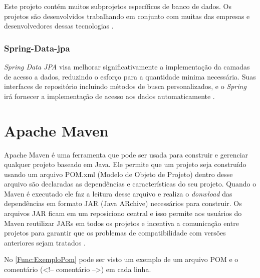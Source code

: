 Este projeto contém muitos subprojetos específicos de banco de dados. Os projetos são desenvolvidos trabalhando em conjunto com muitas das empresas e desenvolvedores dessas tecnologias \cite{springData:2017}.


\subsubsection{Spring-Data-jpa}\label{subsubsec:SpringDatajpa}

\textit{Spring Data JPA} visa melhorar significativamente a implementação da camadas de acesso a dados, reduzindo o esforço para a quantidade minima necessária. Suas interfaces de repositório incluindo métodos de busca personalizados, e o \textit{Spring} irá fornecer a implementação de acesso aos dados automaticamente \cite{springDataJpa:2017}.



\section{Apache Maven}\label{sec:ApacheMaven}

Apache Maven é uma ferramenta que pode ser usada para construir e gerenciar qualquer projeto baseado em Java. Ele permite que um projeto seja construído usando um arquivo POM.xml (Modelo de Objeto de Projeto) dentro desse arquivo são declaradas as dependências e características do seu projeto. Quando o Maven é executado ele faz a leitura desse arquivo e realiza o \textit{donwload} das dependências em formato JAR (Java ARchive) necessários para construir. Os arquivos JAR ficam em um reposiciono central e isso permite aos usuários do Maven reutilizar JARs em todos os projetos e incentiva a comunicação entre projetos para garantir que os problemas de compatibilidade com versões anteriores sejam tratados \cite{ApacheFeature:2017}.


No \autoref{Func:ExemploPom} pode ser visto um exemplo de um arquivo POM e o comentário (<!-- comentário -->) em cada linha.


